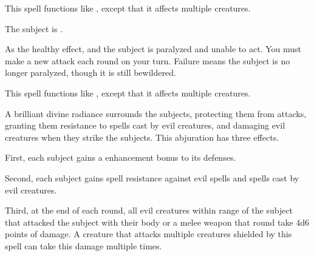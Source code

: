\begin{spelleffect}
    This spell functions like , except that it affects multiple creatures.
\end{spelleffect}

\begin{spellhealthy}
    The subject is \bewildered.
\end{spellhealthy}
\begin{spellblood}
    As the healthy effect, and the subject is paralyzed and unable to act. You must make a new attack each round on your turn. Failure means the subject is no longer paralyzed, though it is still bewildered.
\end{spellblood}

\begin{spelleffect}
    This spell functions like , except that it affects multiple creatures.
\end{spelleffect}

\spelldur{\durshort \dismissable}
\begin{spelleffect}
    A brilliant divine radiance surrounds the subjects, protecting them from attacks, granting them resistance to spells cast by evil creatures, and damaging evil creatures when they strike the subjects. This abjuration has three effects.
    \par First, each subject gains a  enhancement bonus to its defenses.
    \par Second, each subject gains spell resistance against evil spells and spells cast by evil creatures.
    \par Third, at the end of each round, all evil creatures within \rngclose range of the subject that attacked the subject with their body or a melee weapon that round take 4d6 points of damage. A creature that attacks multiple creatures shielded by this spell can take this damage multiple times.
\end{spelleffect}

